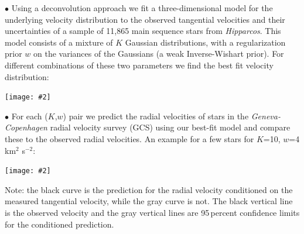 \documentclass[portrait,a0b,final]{a0poster}
\newcommand{\pbox}[4]{
\psshadowbox[#3]{
\begin{minipage}[t][#2][t]{#1}
#4
\end{minipage}
}}
\newcommand{\myfig}[3][0]{
  \texttt{[image: \#2]}
}
\newcommand{\mycaption}[1]{
  \vspace{0.5cm}
  \begin{quote}
    {{\sc Figure} \arabic{figure}: #1}
  \end{quote}
  \vspace{1cm}
  \stepcounter{figure}
}
\begin{document}
\begin{multicols}{2}


{\Large $\bullet$ Using a deconvolution approach we fit a
three-dimensional model for the underlying velocity distribution to
the observed tangential velocities and their uncertainties of a sample
of 11,865 main sequence stars from \emph{Hipparcos}. This model
consists of a mixture of $K$ Gaussian distributions, with a
regularization prior $w$ on the variances of the Gaussians (a weak
Inverse-Wishart prior). For different combinations of these two
parameters we find the best fit velocity distribution:}
\begin{center}
  \myfig{veldensXY.ps}{1}\\[15pt]
\end{center}



{\Large $\bullet$ For each ($K$,$w$) pair we predict the radial
velocities of stars in the \emph{Geneva-Copenhagen} radial velocity
survey (GCS) using our best-fit model and compare these to the
observed radial velocities. An example for a few stars for $K$=10,
$w$=4 km$^2$ s$^{-2}$:}
\begin{center}
  \myfig{predict_gcs_rand.ps}{.9}%
\end{center}
Note: the black curve is the prediction for the radial velocity
conditioned on the measured tangential velocity, while the gray curve
is not. The black vertical line is the observed velocity and the gray
vertical lines are 95\,percent confidence limits for the conditioned
prediction.


\end{multicols}
\end{document}
